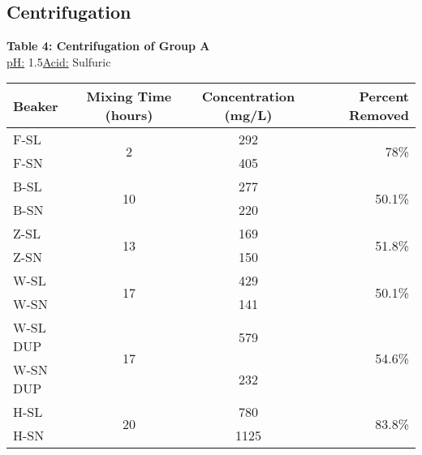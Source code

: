         \subsection{Centrifugation}
\begin{center}
        \renewcommand\arraystretch{1.5}
        \vspace{2 mm}
        {\large{\bf Table 4: Centrifugation of Group A\\}}
        \vspace{2 mm}
        \underline{pH:} 1.5\hspace{5mm}\underline{Acid:} Sulfuric\\
        \vspace{2 mm}
        \begin{tabular}{|l c c r|}
            \hline
            \textbf{Beaker} & \textbf{Mixing Time (hours)} & \textbf{Concentration (mg/L)} & \textbf{Percent Removed} \\ \hline
            F-SL     & \multirow{2}{*}{2}  & 292  & \multirow{2}{*}{78\%}   \\
            F-SN     &  & 405  &    \\\hline
            B-SL     & \multirow{2}{*}{10}  & 277  & \multirow{2}{*}{50.1\%} \\
            B-SN     &  & 220  &  \\\hline
            Z-SL     & \multirow{2}{*}{13}  & 169  & \multirow{2}{*}{51.8\%} \\
            Z-SN     &  & 150  &  \\\hline
            W-SL     & \multirow{2}{*}{17}  & 429  & \multirow{2}{*}{50.1\%} \\
            W-SN     &  & 141  &  \\\hline
            W-SL DUP & \multirow{2}{*}{17} & 579  & \multirow{2}{*}{54.6\%} \\
            W-SN DUP &  & 232  &  \\\hline
            H-SL     & \multirow{2}{*}{20} & 780  & \multirow{2}{*}{83.8\%} \\
            H-SN     &  & 1125 &  \\\hline
        \end{tabular}
        \pgfplotsset{width=8cm}
        \begin{minipage}{.5\textwidth}
            \vspace{30mm}
            \begin{tikzpicture}[baseline=(current bounding box.center)]

\end{tikzpicture}
\end{minipage}
\end{center}
